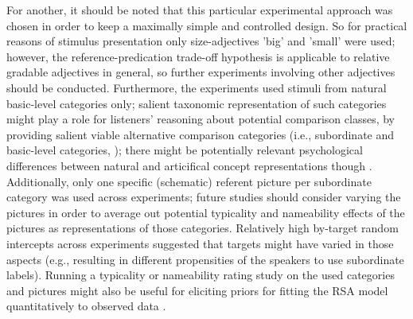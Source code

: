 For another, it should be noted that this particular experimental approach was chosen in order to keep a maximally simple and controlled design. So for practical reasons of stimulus presentation only size-adjectives 'big' and 'small' were used; however, the reference-predication trade-off hypothesis is applicable to relative gradable adjectives in general, so further experiments involving other adjectives should be conducted. 
Furthermore, the experiments used stimuli from natural basic-level categories only; salient taxonomic representation of such categories might play a role for listeners' reasoning about potential comparison classes, by providing salient viable alternative comparison categories (i.e., subordinate and basic-level categories, \textcite[cf.][]{rosch1976, tenenbaum2011grow}); there might be potentially relevant psychological differences between natural and articifical concept representations though %
 \parencite{kalish2002gold}. 
Additionally, only one specific (schematic) referent picture per subordinate category was used across experiments; future studies should consider varying the pictures in order to average out potential typicality and nameability effects of the pictures as representations of those categories. Relatively high by-target random intercepts across experiments suggested that targets might have varied in those aspects (e.g., resulting in different propensities of the speakers to use subordinate labels). Running a typicality or nameability rating study on the used categories and pictures might also be useful for eliciting priors for fitting the RSA model quantitatively to observed data \parencite{franke2016does}. %


